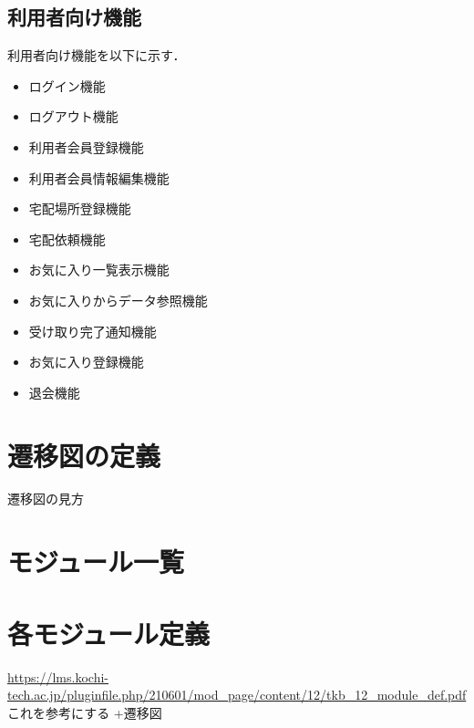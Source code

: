\documentclass[a4paper, titlepage]{jsarticle}
\begin{document}
\subsection{利用者向け機能}
利用者向け機能を以下に示す．
\begin{itemize}[labelwidth=\linewidth]
  \setlength{\leftskip}{1em}

  \item ログイン機能 %
  \item ログアウト機能 %
  \item 利用者会員登録機能 %
  \item 利用者会員情報編集機能 %
  \item 宅配場所登録機能 %
  \item 宅配依頼機能 %
  \item お気に入り一覧表示機能 %
  \item お気に入りからデータ参照機能 %
  \item 受け取り完了通知機能 %
  \item お気に入り登録機能 %
  \item 退会機能 %
\end{itemize}

\section{遷移図の定義}
遷移図の見方

\section{モジュール一覧}

\section{各モジュール定義}
\url{https://lms.kochi-tech.ac.jp/pluginfile.php/210601/mod_page/content/12/tkb_12_module_def.pdf}これを参考にする
+遷移図
\end{document}
